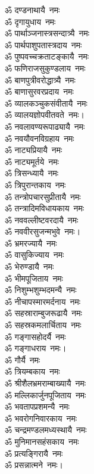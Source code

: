 \begin{multicols}{2}
\begin{flushleft}
ॐ दण्डनाथायै~नमः\\
ॐ दृगायुधाय~नमः\\
ॐ पार्थाञ्जनास्त्रसन्दात्र्यै~नमः\\
ॐ पार्थपाशुपतास्त्रदाय~नमः\\
ॐ पुष्पवच्चक्रताटङ्कायै~नमः\\
ॐ फणिराजसुकुण्डलाय~नमः\\
ॐ बाणपुत्रीवरोद्धात्र्यै~नमः\\
ॐ बाणासुरवरप्रदाय~नमः\\
ॐ व्यालकञ्चुकसंवीतायै~नमः\\
ॐ व्यालयज्ञोपवीतवते~नमः।\hfill{}\\
ॐ नवलावण्यरूपाढ्यायै~नमः\\
ॐ नवयौवनविग्रहाय~नमः\\
ॐ नाट्यप्रियायै~नमः\\
ॐ नाट्यमूर्तये~नमः\\
ॐ त्रिसन्ध्यायै~नमः\\
ॐ त्रिपुरान्तकाय~नमः\\
ॐ तन्त्रोपचारसुप्रीतायै~नमः\\
ॐ तन्त्रादिमविधायकाय~नमः\\
ॐ नववल्लीष्टवरदायै~नमः\\
ॐ नववीरसुजन्मभुवे~नमः।\hfill{}\\
ॐ भ्रमरज्यायै~नमः\\
ॐ वासुकिज्याय~नमः\\
ॐ भेरुण्डायै~नमः\\
ॐ भीमपूजिताय~नमः\\
ॐ निशुम्भशुम्भदमन्यै~नमः\\
ॐ नीचापस्मारमर्दनाय~नमः\\
ॐ सहस्राराम्बुजरूढायै~नमः\\
ॐ सहस्रकमलार्चिताय~नमः\\
ॐ गङ्गासहोदर्यै~नमः\\
ॐ गङ्गाधराय~नमः।\hfill{}\\
ॐ गौर्यै~नमः\\
ॐ त्रियम्बकाय~नमः\\
ॐ श्रीशैलभ्रमराम्बाख्यायै~नमः\\
ॐ मल्लिकार्जुनपूजिताय~नमः\\
ॐ भवतापप्रशमन्यै~नमः\\
ॐ भवरोगनिवारकाय~नमः\\
ॐ चन्द्रमण्डलमध्यस्थायै~नमः\\
ॐ मुनिमानसहंसकाय~नमः\\
ॐ प्रत्यङ्गिरायै~नमः\\
ॐ प्रसन्नात्मने~नमः।\hfill{}\\

\end{flushleft}
\end{multicols}
